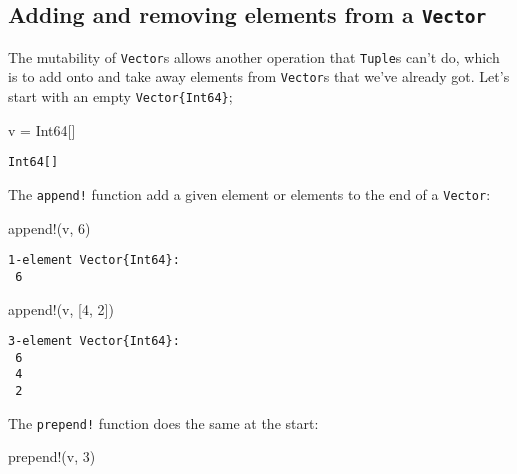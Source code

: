 \documentclass[
  letterpaper,
  DIV=11,
  numbers=noendperiod]{scrreprt}
\newenvironment{Shaded}{\begin{snugshade}}{\end{snugshade}}
\newcommand{\DataTypeTok}[1]{\textcolor[rgb]{0.68,0.00,0.00}{#1}}
\newcommand{\FloatTok}[1]{\textcolor[rgb]{0.68,0.00,0.00}{#1}}
\newcommand{\FunctionTok}[1]{\textcolor[rgb]{0.28,0.35,0.67}{#1}}
\newcommand{\NormalTok}[1]{\textcolor[rgb]{0.00,0.23,0.31}{#1}}
\newcommand{\OperatorTok}[1]{\textcolor[rgb]{0.37,0.37,0.37}{#1}}
\begin{document}
\hypertarget{adding-and-removing-elements-from-a-vector}{%
\subsection{\texorpdfstring{Adding and removing elements from a
\texttt{Vector}}{Adding and removing elements from a Vector}}\label{adding-and-removing-elements-from-a-vector}}

The mutability of \texttt{Vector}s allows another operation that
\texttt{Tuple}s can't do, which is to add onto and take away elements
from \texttt{Vector}s that we've already got. Let's start with an empty
\texttt{Vector\{Int64\}};

\begin{Shaded}
\begin{Highlighting}[]
\NormalTok{v }\OperatorTok{=} \DataTypeTok{Int64}\NormalTok{[]}
\end{Highlighting}
\end{Shaded}

\begin{verbatim}
Int64[]
\end{verbatim}

The \texttt{append!} function add a given element or elements to the end
of a \texttt{Vector}:

\begin{Shaded}
\begin{Highlighting}[]
\FunctionTok{append!}\NormalTok{(v, }\FloatTok{6}\NormalTok{)}
\end{Highlighting}
\end{Shaded}

\begin{verbatim}
1-element Vector{Int64}:
 6
\end{verbatim}

\begin{Shaded}
\begin{Highlighting}[]
\FunctionTok{append!}\NormalTok{(v, [}\FloatTok{4}\NormalTok{, }\FloatTok{2}\NormalTok{])}
\end{Highlighting}
\end{Shaded}

\begin{verbatim}
3-element Vector{Int64}:
 6
 4
 2
\end{verbatim}

The \texttt{prepend!} function does the same at the start:

\begin{Shaded}
\begin{Highlighting}[]
\FunctionTok{prepend!}\NormalTok{(v, }\FloatTok{3}\NormalTok{)}
\end{Highlighting}
\end{Shaded}
\end{document}
